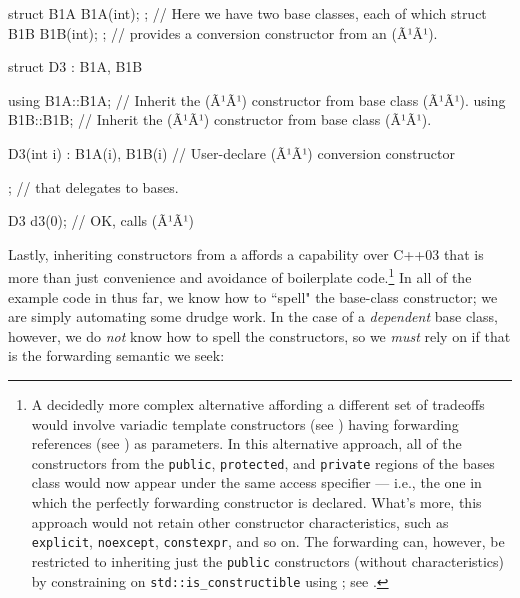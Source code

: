 \begin{emcppslisting}[language=C++]
struct B1A { B1A(int); };  // Here we have two base classes, each of which
struct B1B { B1B(int); };  // provides a conversion constructor from an (Ã¹{}Ã¹).

struct D3 : B1A, B1B
{
    using B1A::B1A;  // Inherit the (Ã¹{}Ã¹) constructor from base class (Ã¹{}Ã¹).
    using B1B::B1B;  // Inherit the (Ã¹{}Ã¹) constructor from base class (Ã¹{}Ã¹).

    D3(int i) : B1A(i), B1B(i) { }  // User-declare (Ã¹{}Ã¹) conversion constructor
};                                  // that delegates to bases.

D3 d3(0);  // OK, calls (Ã¹{}Ã¹)
\end{emcppslisting}
    
\noindent Lastly, inheriting constructors from a  affords a capability over C++03 that is more than just convenience
and avoidance of boilerplate code.{\cprotect\footnote{A decidedly more
complex alternative affording a different set of tradeoffs would
  involve variadic template constructors (see ) 
  having
 forwarding references (see ) 
 as parameters. In this
  alternative approach, all of the constructors from the
  \mbox{\lstinline!public!}, \mbox{\lstinline!protected!}, and \mbox{\lstinline!private!} regions of the
  bases class would now appear under the same access specifier --- i.e.,
  the one in which the perfectly forwarding constructor is declared.
  What's more, this approach would not retain other constructor
  characteristics, such as \lstinline!explicit!, \lstinline!noexcept!,
  \lstinline!constexpr!, and so on. The forwarding can, however, be restricted to
  inheriting just the \lstinline!public! constructors (without
  characteristics) by constraining on \lstinline!std::is_constructible!
  using ; see .}} 
  In all of the example code in  
  thus far, we know how to ``spell" the
base-class constructor; we are simply automating some drudge work. In
the case of a \emph{dependent} base class, however, we do \emph{not}
know how to spell the constructors, so we \emph{must} rely on
 if that is the forwarding semantic we
seek:

